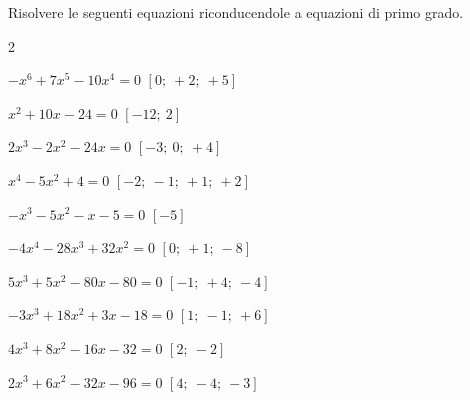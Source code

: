 \begin{esercizio}[*]
\label{ese:20.6}
Risolvere le seguenti equazioni riconducendole a equazioni di primo grado.
\begin{htmulticols}{2}
\begin{enumeratea}
 \item \(-x^{6}+7x^{5}-10x^{4}=0\) \hfill \(\left[0;~+2;~+5\right]\)
 \item \(x^{2}+10x-24=0\) \hfill \(\left[-12;~2\right]\)
 \item \(2x^{3}-2x^{2}-24x=0\) \hfill \(\left[-3;~0;~+4\right]\)
 \item \(x^{4}-5x^{2}+4=0\) \hfill \(\left[-2;~-1;~+1;~+2\right]\)
 \item \(-x^{3}-5x^{2}-x-5=0\) \hfill \(\left[-5\right]\)
 \item \(-4x^{4}-28x^{3}+32x^{2}=0\) \hfill \(\left[0;~+1;~-8\right]\)
 \item \(5x^{3}+5x^{2}-80x-80=0\) \hfill \(\left[-1;~+4;~-4\right]\)
 \item \(-3x^{3}+18x^{2}+3x-18=0\) \hfill \(\left[1;~-1;~+6\right]\)
 \item \(4x^{3}+8x^{2}-16x-32=0\) \hfill \(\left[2;~-2\right]\)
 \item \(2x^{3}+6x^{2}-32x-96=0\) \hfill \(\left[4;~-4;~-3\right]\)
\end{enumeratea}
\end{htmulticols}
\end{esercizio}

